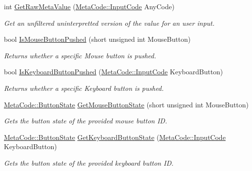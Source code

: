 \begin{DoxyCompactItemize}
int \hyperlink{classphys_1_1InputQueryTool_a59fb8638d5d3ce89f4347ca8090a1afb}{GetRawMetaValue} (\hyperlink{classphys_1_1MetaCode_a3e501cbb5bf0f6f1fdb7211465bda8d8}{MetaCode::InputCode} AnyCode)
\begin{DoxyCompactList}\small\item\em Get an unfiltered uninterpretted version of the value for an user input. \item\end{DoxyCompactList}\item 
bool \hyperlink{classphys_1_1InputQueryTool_aab9a7be4d95289d828378f7f3d5fc065}{IsMouseButtonPushed} (short unsigned int MouseButton)
\begin{DoxyCompactList}\small\item\em Returns whether a specific Mouse button is pushed. \item\end{DoxyCompactList}\item 
bool \hyperlink{classphys_1_1InputQueryTool_a6f210acb5f4e2fe052b0c3c7c3ec9418}{IsKeyboardButtonPushed} (\hyperlink{classphys_1_1MetaCode_a3e501cbb5bf0f6f1fdb7211465bda8d8}{MetaCode::InputCode} KeyboardButton)
\begin{DoxyCompactList}\small\item\em Returns whether a specific Keyboard button is pushed. \item\end{DoxyCompactList}\item 
\hyperlink{classphys_1_1MetaCode_a2fdfb26b3e50ceb0ccc60bfc4c3d6ac2}{MetaCode::ButtonState} \hyperlink{classphys_1_1InputQueryTool_a1ef8b70af163d8bc703fd16c3fcce22d}{GetMouseButtonState} (short unsigned int MouseButton)
\begin{DoxyCompactList}\small\item\em Gets the button state of the provided mouse button ID. \item\end{DoxyCompactList}\item 
\hyperlink{classphys_1_1MetaCode_a2fdfb26b3e50ceb0ccc60bfc4c3d6ac2}{MetaCode::ButtonState} \hyperlink{classphys_1_1InputQueryTool_ad279cce170ff68ba9f343f6b22b2c621}{GetKeyboardButtonState} (\hyperlink{classphys_1_1MetaCode_a3e501cbb5bf0f6f1fdb7211465bda8d8}{MetaCode::InputCode} KeyboardButton)
\begin{DoxyCompactList}\small\item\em Gets the button state of the provided keyboard button ID. \item\end{DoxyCompactList}\item 

\end{DoxyCompactItemize}
